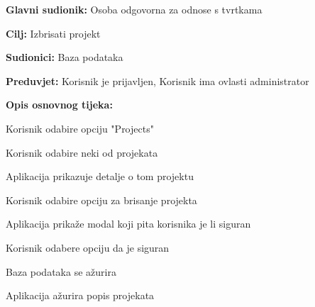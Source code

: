 					\noindent {}
					\begin{packed_item}
					
						\item \textbf{Glavni sudionik:} Osoba odgovorna za odnose s tvrtkama
						\item \textbf{Cilj:} Izbrisati projekt
						\item \textbf{Sudionici:} Baza podataka
						\item \textbf{Preduvjet:} Korisnik je prijavljen, Korisnik ima ovlasti administrator
						\item \textbf{Opis osnovnog tijeka:}
					
						\item[] \begin{packed_enum}

							\item Korisnik odabire opciju "Projects"
							\item Korisnik odabire neki od projekata
							\item Aplikacija prikazuje detalje o tom projektu
							\item Korisnik odabire opciju za brisanje projekta
							\item Aplikacija prikaže modal koji pita korisnika je li siguran
							\item Korisnik odabere opciju da je siguran
							\item Baza podataka se ažurira
							\item Aplikacija ažurira popis projekata
						\end{packed_enum}
					
					\end{packed_item}

